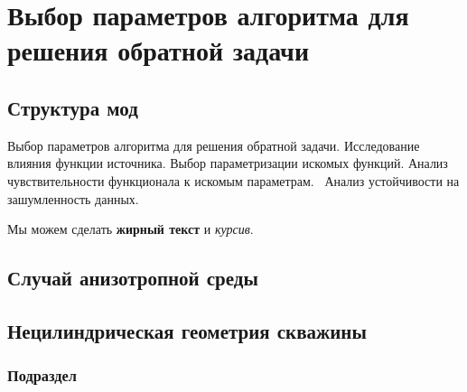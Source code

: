 \chapter{Выбор параметров алгоритма для решения обратной задачи}\label{ch:ch_my_5}

\section{Структура мод}\label{sec:ch_my_5/sec1}

Выбор параметров алгоритма для решения обратной задачи. Исследование влияния функции источника. Выбор параметризации искомых функций. Анализ чувствительности функционала к искомым параметрам.  Анализ устойчивости на зашумленность данных.

Мы можем сделать \textbf{жирный текст} и \textit{курсив}.

\section{Случай анизотропной среды}\label{sec:ch_my_1/sec2}


\section{Нецилиндрическая геометрия скважины}\label{sec:ch_my_1/sec3}


\subsection{Подраздел}\label{subsec:ch_my_1/sec3/sub1}

